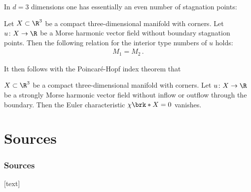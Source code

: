 \begin{frame}
  In $d=3$ dimensions one has essentially an even number of stagnation points:
  \begin{proposition}
    Let $X\subset\R^3$ be a compact three-dimensional manifold with corners.
    Let $u\colon X\to\R$ be a Morse harmonic vector field without boundary stagnation points.
    Then the following relation for
    the interior type numbers of $u$ holds:
    \begin{align*}
      M_1=M_2\,.
    \end{align*}
  \end{proposition}
\end{frame}

\begin{frame}
  It then follows with the Poincaré-Hopf index theorem that
  \begin{corollary}
    $X\subset\R^3$ be a compact three-dimensional manifold with corners.
    Let $u\colon X\to\R$ be a strongly Morse harmonic vector field without inflow or outflow through the boundary.
    Then the Euler characteristic $\chi\brk*{X}=0$ vanishes.
  \end{corollary}
\end{frame}

\section{Sources}

\begin{frame}[allowframebreaks]
	\frametitle{Sources}
	\nocite{*}

	[text]
	\printbibliography
\end{frame}

